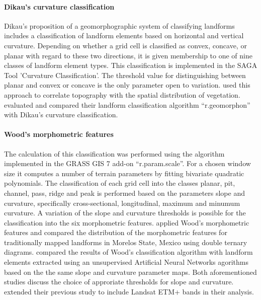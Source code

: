 \documentclass[preprint,12pt,authoryear]{elsarticle}
\begin{document}
\paragraph{Dikau's curvature classification \citep{Dikau1988}}
Dikau's proposition of a geomorphographic system of classifying landforms includes a classification of landform elements based on horizontal and vertical curvature. Depending on whether a grid cell is classified as convex, concave, or  planar with regard to these two directions, it is given membership to one of nine classes of landform element types. This classification is implemented in the SAGA Tool 'Curvature Classification'. The threshold value for distinguishing between planar and convex or concave is the only parameter open to variation. \cite{Hoersch2002} used this approach to correlate topography with the spatial distribution of vegetation. \cite{Jasiewicz2013} evaluated and compared their landform classification algorithm “r.geomorphon” with Dikau's curvature classification.
\paragraph{Wood's morphometric features \citep{Wood1996}}
The calculation of this classification was performed using the algorithm implemented in the GRASS GIS 7  add-on “r.param.scale”.  For a chosen window size it computes a number of terrain parameters by fitting bivariate quadratic polynomials.  The classification of each grid cell into the classes planar, pit, channel, pass, ridge and peak is performed based on the parameters slope and curvature, specifically cross-sectional, longitudinal, maximum and minumum curvature. A variation of  the slope and curvature thresholds is possible for the classification into the six morphometric features.
\cite{Bolongaro-Crevenna2005} applied Wood's morphometric features and compared the distribution of the morphometric features for traditionally mapped landforms in Morelos State, Mexico using double ternary diagrams. \cite{Ehsani2008} compared the results of Wood's classification algorithm with landform elements extracted using  an unsupervised Artificial Neural Networks agorithms based on the the same slope and curvature parameter maps. Both aforementioned studies discuss the choice of approriate thresholds for slope and curvature. \cite{Ehsani2009} extended their previous study  to include Landsat ETM+ bands in their analysis.  
\end{document}

